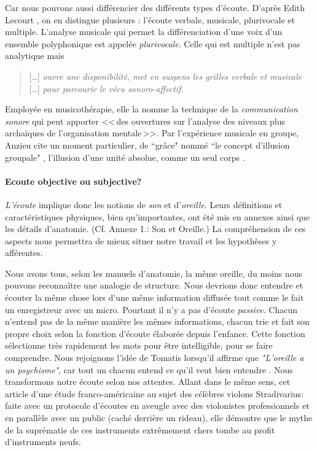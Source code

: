Car nous pouvons aussi différencier des différents types d'écoute. D'après Edith Lecourt \autocite [p. 182] {lecourt:decouvrir},
on en distingue plusieurs : l'écoute verbale, musicale, plurivocale et multiple.
 L'analyse musicale qui permet la différenciation d'une voix d'un ensemble polyphonique est appelée \emph{plurivocale}. Celle qui est multiple n'est pas analytique  mais
 \begin{quote}
 	 [\ldots] \textit{ouvre une disponibilité, met en suspens les grilles verbale et musicale} [\ldots] \emph{pour parcourir le vécu sonoro-affectif}\autocite[p. 183]{lecourt:decouvrir}.
 \end{quote}
 Employée en musicothérapie, elle la nomme la technique de la  \emph{communication sonore} qui peut apporter
 <<\,des ouvertures sur l'analyse des niveaux plus archaïques de l'organisation mentale\,>>\autocite[p. 154]{lecourt:decouvrir}.
 Par l'expérience musicale en groupe, Anzieu cite un moment
 particulier, de ``grâce"  nommé ``le concept d'illusion groupale" \autocite[p. 113]{AnzieuMoiPeau},
 l'illusion d'une unité absolue, comme un seul corps .








\paragraph{Ecoute objective ou subjective?}

\emph{L'écoute} implique donc les notions de \emph{son} et
d'\emph{oreille}. Leurs définitions et caractéristiques physiques, bien qu'importantes, ont été mis en
annexes ainsi que les détails
d'anatomie. (Cf. Annexe 1.: Son et Oreille.)
La compréhension de ces aspects nous
permettra de mieux situer notre travail et les hypothèses y afférentes.


Nous avons tous,
selon les manuels d'anatomie, la même
oreille, du moins nous pouvons reconnaître une analogie de structure. Nous devrions donc entendre et écouter la même chose
lors d'une même information diffusée tout comme le fait un enregistreur avec un micro. Pourtant il n'y a pas d'écoute \emph{passive}. Chacun n'entend pas de la même manière les mêmes
informations, chacun trie et fait son propre choix selon la fonction
d'écoute élaborée depuis l'enfance. Cette fonction sélectionne très
rapidement les mots pour être intelligible, pour se faire
comprendre. Nous rejoignons l'idée de Tomatis lorsqu'il affirme que
\textit{"L'oreille a un psychisme"}, car tout un chacun entend ce qu'il veut bien
entendre \autocite [p. 167]{tomatis_oreille_1998}.
Nous transformons notre écoute selon nos attentes.
Allant dans le même sens, cet
article d'une
étude franco-américaine \autocite{lemonde.fr:stradivarius} au sujet des célèbres violons
Stradivarius: faite avec un protocole
d'écoutes en aveugle avec
des violonistes professionnels et en parallèle avec un public (caché
derrière un rideau), elle démontre que le mythe de la suprématie
de ces instruments extrêmement chers tombe au profit d'instruments
neufs.

